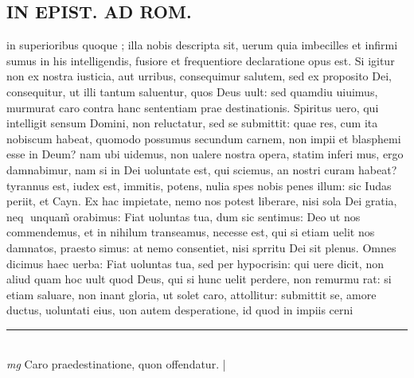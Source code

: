 \documentclass{article}
\begin{document}
\begin{pages}
\section*{IN EPIST. AD ROM.   }
\marginpar{[ p.]}\pstart in superioribus quoque ; illa nobis descripta sit, uerum quia imbecilles et infirmi sumus in his intelligendis, fusiore et frequentiore declaratione opus est. Si igitur non ex nostra iusticia, aut urribus, consequimur salutem, sed ex proposito Dei, consequitur, ut illi tantum saluentur, quos Deus uult: sed quamdiu uiuimus, murmurat caro contra hanc sententiam prae destinationis. Spiritus uero, qui intelligit sensum Domini, non reluctatur, sed se submittit: quae res, cum ita nobiscum habeat, quomodo possumus secundum carnem, non impii et blasphemi esse in Deum? nam ubi uidemus, non ualere nostra opera, statim inferi mus, ergo damnabimur, nam si in Dei uoluntate est, qui sciemus, an nostri curam habeat? tyrannus est, iudex est, immitis, potens, nulia spes nobis penes illum: sic Iudas periit, et Cayn. Ex hac impietate, nemo nos potest liberare, nisi sola Dei gratia, neq unquam̃ orabimus: Fiat uoluntas tua, dum sic sentimus: Deo ut nos commendemus, et in nihilum transeamus, necesse est, qui si etiam uelit nos damnatos, praesto simus: at nemo consentiet, nisi sprritu Dei sit plenus.  Omnes dicimus haec uerba: Fiat uoluntas tua, sed per hypocrisin: qui uere dicit, non aliud quam hoc uult quod Deus, qui si hunc uelit perdere, non remurmu rat: si etiam saluare, non inant gloria, ut solet caro, attollitur: submittit se, amore ductus, uoluntati eius, uon autem desperatione, id quod in impiis cerni\pend
\vspace{0.5cm}\noindent
\vspace{0.2cm}\rule{1cm}{0.2pt}\\ 
\hspace{0.2cm}\textit{mg}
\footnotesize Caro praedestinatione, quon offendatur.  
\normalsize| 

\end{pages}
\end{document}
